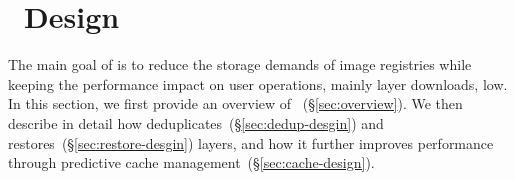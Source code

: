 \section{\sysname~Design}
\label{sec:Sift}

The main goal of \sysname is to reduce the storage demands of image registries
while keeping the performance impact on user operations, mainly layer downloads, low.
%
In this section, we first provide an overview of
\sysname~(\S\ref{sec:overview}).
%
We then describe in detail how \sysname deduplicates~(\S\ref{sec:dedup-desgin})
and restores~(\S\ref{sec:restore-desgin}) layers, and how it further improves
performance through predictive cache management~(\S\ref{sec:cache-design}).








